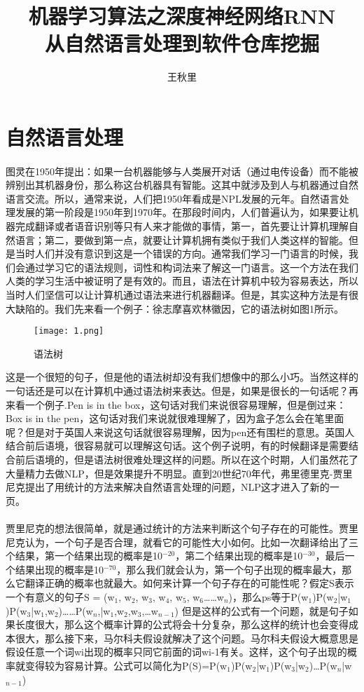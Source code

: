 \documentclass[UTF8]{ctexart}
\author{王秋里}
\title{机器学习算法之深度神经网络RNN\\从自然语言处理到软件仓库挖掘}
\begin{document}
  
	\maketitle   
	\section{自然语言处理}      
			\paragraph{}
			图灵在1950年提出：如果一台机器能够与人类展开对话（通过电传设备）而不能被辨别出其机器身份，那么称这台机器具有智能。这其中就涉及到人与机器通过自然语言交流。所以，通常来说，人们把1950年看成是NPL发展的元年。自然语言处理发展的第一阶段是1950年到1970年。在那段时间内，人们普遍认为，如果要让机器完成翻译或者语音识别等只有人来才能做的事情，第一，首先要让计算机理解自然语言；第二，要做到第一点，就要让计算机拥有类似于我们人类这样的智能。但是当时人们并没有意识到这是一个错误的方向。通常我们学习一门语言的时候，我们会通过学习它的语法规则，词性和构词法来了解这一门语言。这一个方法在我们人类的学习生活中被证明了是有效的。而且，语法在计算机中较为容易表达，所以当时人们坚信可以让计算机通过语法来进行机器翻译。但是，其实这种方法是有很大缺陷的。我们先来看一个例子：徐志摩喜欢林徽因，它的语法树如图1所示。
\begin{figure}
\centering
\texttt{[image: 1.png]}
\caption{语法树}
\label{fig:test}
\end{figure}
			这是一个很短的句子，但是他的语法树却没有我们想像中的那么小巧。当然这样的一句话还是可以在计算机中通过语法树来表达。但是，如果是很长的一句话呢？再来看一个例子.Pen is in the box，这句话对我们来说很容易理解，但是倒过来：Box is in the pen，这句话对我们来说就很难理解了，因为盒子怎么会在笔里面呢？但是对于英国人来说这句话就很容易理解，因为pen还有围栏的意思。英国人结合前后语境，很容易就可以理解这句话。这个例子说明，有的时候翻译是需要结合前后语境的，但是语法树很难处理这样的问题。所以在这个时期，人们虽然花了大量精力去做NLP，但是效果提升不明显。直到20世纪70年代，弗里德里克-贾里尼克提出了用统计的方法来解决自然语言处理的问题，NLP这才进入了新的一页。
			\paragraph{}
			贾里尼克的想法很简单，就是通过统计的方法来判断这个句子存在的可能性。贾里尼克认为，一个句子是否合理，就看它的可能性大小如何。比如一次翻译给出了三个结果，第一个结果出现的概率是10$^{-20}$，第二个结果出现的概率是10$^{-30}$，最后一个结果出现的概率是10$^{-70}$，那么我们就会认为，第一个句子出现的概率最大，那么它翻译正确的概率也就最大。如何来计算一个句子存在的可能性呢？假定S表示一个有意义的句子S = (w$_{1}$, w$_{2}$, w$_{3}$, w$_{4}$, w$_{5}$, w$_{6}$……w$_{n}$)，那么ps等于P(w$_{1}$)P(w$_{2}$|w$_{1}$)P(w$_{3}$|w$_{1}$,w${_2}$)……P(w$_{n}$,|w$_{1}$,w$_{2}$,w$_{3}$,…w$_{n-1}$)
但是这样的公式有一个问题，就是句子如果长度很大，那么这个概率计算的公式将会十分复杂，那么这样的统计也会变得成本很大，那么接下来，马尔科夫假设就解决了这个问题。马尔科夫假设大概意思是假设任意一个词wi出现的概率只同它前面的词wi-1有关。这样，这个句子出现的概率就变得较为容易计算。公式可以简化为P(S)=P(w$_{1}$)P(w$_{2}$|w$_{1}$)P(w$_{3}$|w$_{2}$)…P(w$_{n}$|w$_{n-1}$)
\end{document}

